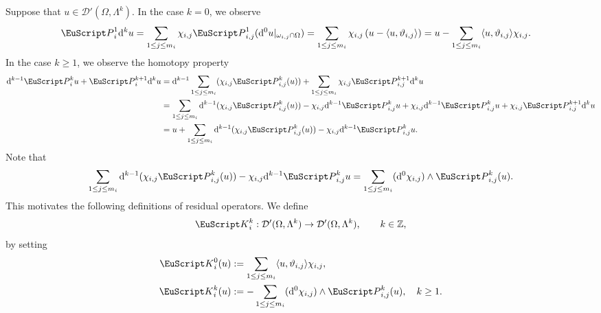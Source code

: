 \documentclass[10pt,a4paper]{amsart}
\theoremstyle{definition}
\theoremstyle{remark}
\numberwithin{equation}{section}
\newcommand{\bbZ}{{\mathbb Z}}
\newcommand{\calD}{{\mathcal D}}
\newcommand{\euK}{{\EuScript K}}
\newcommand{\euP}{{\EuScript P}}
\renewcommand{\restriction}{|}
\newcommand{\cartan}{{\mathrm d}}
\newcommand{\Domain}{{\Omega}}
\newcommand{\subdomain}{{\omega}}
\newcommand{\Alt}[1]{\Lambda^{#1}}
\newcommand{\Poincare}{\euP}
\newcommand{\Defect}{\euK}
\newcommand{\weight}{\vartheta}
\begin{document}
Suppose that $u \in \calD'(\Domain,\Alt{k})$. 
In the case $k = 0$, we observe 
\begin{align*}
    \Poincare^{1}_{i} \cartan^{k} u
    &
    =
    \sum_{1 \leq j \leq m_{i}} \chi_{i,j} \Poincare^{1}_{i,j}( \cartan^{0} u \restriction_{ \subdomain_{i,j} \cap \Domain } )
=
    \sum_{1 \leq j \leq m_{i}} \chi_{i,j} \left( u - \langle u, \weight_{i,j} \rangle \right)
=
    u - \sum_{1 \leq j \leq m_{i}} \langle u, \weight_{i,j} \rangle \chi_{i,j} 
    .
\end{align*}
In the case $k \geq 1$, we observe the homotopy property
\begin{align*}
    \cartan^{k-1} \Poincare^{k}_{i} u + \Poincare^{k+1}_{i} \cartan^{k} u 
    &
    =
    \cartan^{k-1} \sum_{1 \leq j \leq m_{i}} ( \chi_{i,j} \Poincare^{k}_{i,j}(u) ) 
    + 
    \sum_{1 \leq j \leq m_{i}} \chi_{i,j} \Poincare^{k+1}_{i,j} \cartan^{k} u 
    \\&
    =
    \sum_{1 \leq j \leq m_{i}}
    \cartan^{k-1} ( \chi_{i,j} \Poincare^{k}_{i,j}(u) ) 
    - 
    \chi_{i,j} \cartan^{k-1} \Poincare^{k}_{i,j} u 
    + 
    \chi_{i,j} \cartan^{k-1} \Poincare^{k}_{i,j} u 
    + 
    \chi_{i,j} \Poincare^{k+1}_{i,j} \cartan^{k} u 
    \\&
    =
    u
    +
    \sum_{1 \leq j \leq m_{i}}
    \cartan^{k-1} ( \chi_{i,j} \Poincare^{k}_{i,j}(u) )
    - 
    \chi_{i,j} \cartan^{k-1} \Poincare^{k}_{i,j} u 
    .
\end{align*}
Note that 
\begin{align*}
    \sum_{1 \leq j \leq m_{i}}
    \cartan^{k-1} ( \chi_{i,j} \Poincare^{k}_{i,j}(u) )
    - 
    \chi_{i,j} \cartan^{k-1} \Poincare^{k}_{i,j} u 
    =
    \sum_{1 \leq j \leq m_{i}}
    ( \cartan^{0} \chi_{i,j} ) \wedge \Poincare^{k}_{i,j}(u) 
    .
\end{align*}
This motivates the following definitions of residual operators. 
We define 
\begin{align*}
    \Defect^{k}_{i} : \calD'(\Domain,\Alt{k}) \to \calD'(\Domain,\Alt{k})
    ,
    \qquad 
    k \in \bbZ
    ,
\end{align*}
by setting 
\begin{align*}
    \Defect^{0}_{i}(u)
    &
    :=
    \sum_{1 \leq j \leq m_{i}} 
    \langle u, \weight_{i,j} \rangle \chi_{i,j},
    \\
    \Defect^{k}_{i}(u)
    &
    :=
    -\sum_{1 \leq j \leq m_{i}}
    ( \cartan^{0} \chi_{i,j} ) \wedge \Poincare^{k}_{i,j}(u), \quad k \geq 1
    .
\end{align*}
\end{document}
